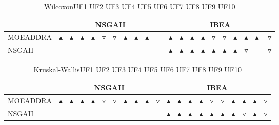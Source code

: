 \documentclass{article}
\begin{document}
\begin{table}[!h]
\caption{WilcoxonUF1 UF2 UF3 UF4 UF5 UF6 UF7 UF8 UF9 UF10 }
\label{Table:wilcoxon}
\centering
\begin{scriptsize}
\begin{tabular}{| l | p{0.03cm }p{0.03cm }p{0.03cm }p{0.03cm }p{0.03cm }p{0.03cm }p{0.03cm }p{0.03cm }p{0.03cm }p{0.03cm } | p{0.03cm }p{0.03cm }p{0.03cm }p{0.03cm }p{0.03cm }p{0.03cm }p{0.03cm }p{0.03cm }p{0.03cm }p{0.03cm } | }
\hline \multicolumn{1}{|c|}{} & \multicolumn{10}{c|}{NSGAII}& \multicolumn{10}{c|}{IBEA}\\
\hline 
MOEADDRA  & $\blacktriangle$&$\blacktriangle$&$\blacktriangle$&$\blacktriangle$&$\triangledown$&$\triangledown$&$\blacktriangle$&$\blacktriangle$&$\blacktriangle$&$-$ & $\blacktriangle$&$\blacktriangle$&$\blacktriangle$&$\blacktriangle$&$\triangledown$&$\triangledown$&$\blacktriangle$&$\blacktriangle$&$\blacktriangle$&$\triangledown$ \\ 
NSGAII  &   &  &  &  &  &  &  &  &  &   & $\blacktriangle$&$\blacktriangle$&$\blacktriangle$&$\blacktriangle$&$\blacktriangle$&$\blacktriangle$&$\blacktriangle$&$\triangledown$&$-$&$\triangledown$ \\ 
\hline
\end{tabular}
\end{scriptsize}
\end{table}


\begin{table}[!h]
\caption{Kruskal-WallisUF1 UF2 UF3 UF4 UF5 UF6 UF7 UF8 UF9 UF10 }
\label{Table:kruskal}
\centering
\begin{scriptsize}
\begin{tabular}{| l | p{0.03cm }p{0.03cm }p{0.03cm }p{0.03cm }p{0.03cm }p{0.03cm }p{0.03cm }p{0.03cm }p{0.03cm }p{0.03cm } | p{0.03cm }p{0.03cm }p{0.03cm }p{0.03cm }p{0.03cm }p{0.03cm }p{0.03cm }p{0.03cm }p{0.03cm }p{0.03cm } | }
\hline \multicolumn{1}{|c|}{} & \multicolumn{10}{c|}{NSGAII}& \multicolumn{10}{c|}{IBEA}\\
\hline 
MOEADDRA  & $\blacktriangle$&$\blacktriangle$&$\blacktriangle$&$\blacktriangle$&$\triangledown$&$\triangledown$&$\blacktriangle$&$\blacktriangle$&$\blacktriangle$&$\triangledown$ & $\blacktriangle$&$\blacktriangle$&$\blacktriangle$&$\blacktriangle$&$\triangledown$&$\triangledown$&$\blacktriangle$&$\blacktriangle$&$\blacktriangle$&$\triangledown$ \\ 
NSGAII  &   &  &  &  &  &  &  &  &  &   & $\blacktriangle$&$\blacktriangle$&$\blacktriangle$&$\blacktriangle$&$\blacktriangle$&$\blacktriangle$&$\blacktriangle$&$\triangledown$&$\blacktriangle$&$\triangledown$ \\ 
\hline
\end{tabular}
\end{scriptsize}
\end{table}
\end{document}
